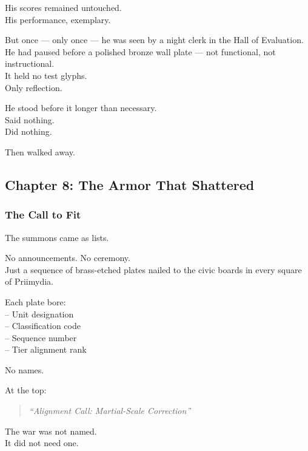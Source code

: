 \documentclass[12pt]{article}
\begin{document}
\vspace{1em}

His scores remained untouched.\\
His performance, exemplary.

But once — only once — he was seen by a night clerk in the Hall of Evaluation.\\
He had paused before a polished bronze wall plate — not functional, not instructional.\\
It held no test glyphs.\\
Only reflection.

He stood before it longer than necessary.\\
Said nothing.\\
Did nothing.

Then walked away.

\newpage

\subsection{Chapter 8: The Armor That Shattered}

\vspace{.5in}

\subsubsection{The Call to Fit}

The summons came as lists.

No announcements. No ceremony.\\
Just a sequence of brass-etched plates nailed to the civic boards in every square of Priimydia.

Each plate bore:\\
\hspace*{1em}-- Unit designation\\
\hspace*{1em}-- Classification code\\
\hspace*{1em}-- Sequence number\\
\hspace*{1em}-- Tier alignment rank

No names.

At the top:

\begin{quote}
\textit{“Alignment Call: Martial-Scale Correction”}
\end{quote}

The war was not named.\\
It did not need one.
\end{document}
